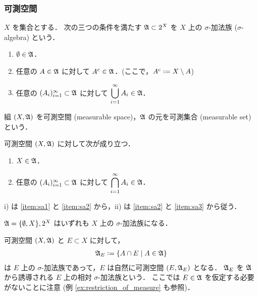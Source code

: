 \subsubsection{可測空間}\label{sec:measurable_space}

\begin{definition}
    $X$ を集合とする．
    次の三つの条件を満たす $\mathfrak{A}\subset2^X$ を $X$ 上の $\sigma$-加法族 ($\sigma$-algebra) という．
    \begin{enumerate}[label=\textsf{(SA\arabic*)},align=left]
        \item\label{item:sa1} $\emptyset\in\mathfrak{A}$．
        \item\label{item:sa2} 任意の $A\in\mathfrak{A}$ に対して $A^{\mathrm{c}}\in\mathfrak{A}$．\quad (ここで，$A^\crm\defeq X\setminus A$)
        \item\label{item:sa3} 任意の $(A_i)_{i=1}^\infty\subset\mathfrak{A}$ に対して $\displaystyle\bigcup_{i=1}^\infty A_i\in\mathfrak{A}$．
    \end{enumerate}
    組 $(X,\mathfrak{A})$ を可測空間 (measurable space)，$\mathfrak{A}$ の元を可測集合 (measurable set) という．
\end{definition}

\begin{remark}\label{rem:measurable_space_other_axioms}
    可測空間 $(X,\mathfrak{A})$ に対して次が成り立つ．
    \begin{enumerate}
        \item $X\in\mathfrak{A}$．
        \item 任意の $(A_i)_{i=1}^\infty\subset\mathfrak{A}$ に対して $\displaystyle\bigcap_{i=1}^\infty A_i\in\mathfrak{A}$．
    \end{enumerate}
    \textrm{i)} は \ref{item:sa1} と \ref{item:sa2} から，\textrm{ii)} は \ref{item:sa2} と \ref{item:sa3} から従う．
\end{remark}

\begin{example}
    $\mathfrak{A}=\{\emptyset,X\},2^X$ はいずれも $X$ 上の $\sigma$-加法族になる．
\end{example}

\begin{example}\label{ex:relative_sigma_algebra}
    可測空間 $(X,\mathfrak{A})$ と $E\subset X$ に対して，
    \begin{align*}
        \Afrak_E\defeq\{A\cap E\mid A\in\Afrak\}
    \end{align*}
    は $E$ 上の $\sigma$-加法族であって，$E$ は自然に可測空間 $(E,\mathfrak{A}_E)$ となる．
    $\mathfrak{A}_E$ を $\mathfrak{A}$ から誘導される $E$ 上の相対 $\sigma$-加法族という．
    ここでは $E\in\mathfrak{A}$ を仮定する必要がないことに注意 (例 \ref{ex:restriction_of_measure} も参照)．
\end{example}

